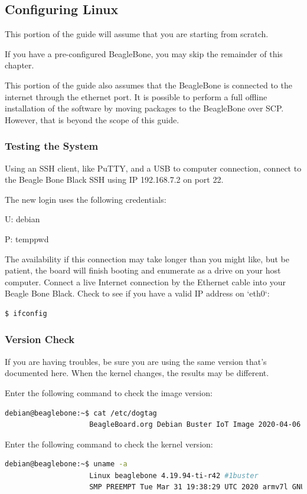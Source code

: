     \subsection{Configuring Linux}
        This portion of the guide will assume that you are starting from scratch.
        
        If you have a pre-configured BeagleBone, you may skip the remainder of this chapter.
        
        This portion of the guide also assumes that the BeagleBone is connected to the internet through the     ethernet port. It is possible to perform a full offline installation of the software by moving  packages to the BeagleBone over SCP. However, that is beyond the scope of this guide.
        
        \subsubsection{Testing the System}
            Using an SSH client, like PuTTY, and a USB to computer connection, connect to the Beagle Bone   Black SSH using IP 192.168.7.2 on port 22.
    
            The new login uses the following credentials:
    
            U: debian
    
            P: temppwd
    
            The availability if this connection may take longer than you might like, but be patient, the    board will finish booting and enumerate as a drive on your host computer. 
            Connect a live Internet connection by the Ethernet cable into your Beagle Bone Black. Check to  see if you have a valid IP address on `eth0`:
            
            \begin{lstlisting}[language=bash, autogobble=true]
                $ ifconfig
            \end{lstlisting}
                \subsubsection{Version Check}
                If you are having troubles, be sure you are using the same version that's documented here.  When the kernel changes, the results may be different. 
                
                Enter the following command to check the image version:
                \begin{lstlisting}[language=bash, autogobble=true]
                    debian@beaglebone:~$ cat /etc/dogtag
                    BeagleBoard.org Debian Buster IoT Image 2020-04-06
                \end{lstlisting}
                Enter the following command to check the kernel version:
                \begin{lstlisting}[language=bash, autogobble=true]
                    debian@beaglebone:~$ uname -a
                    Linux beaglebone 4.19.94-ti-r42 #1buster 
                    SMP PREEMPT Tue Mar 31 19:38:29 UTC 2020 armv7l GNU/Linux
                \end{lstlisting}
